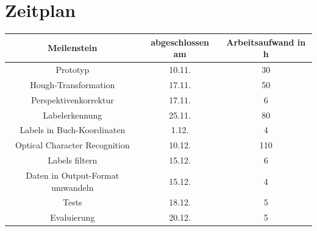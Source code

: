 \documentclass[deutsch]{scrartcl}
\begin{document}
\section{Zeitplan}
\begin{table}[h!]
	\centering
		\begin{tabular}{|c|c|c|}
		\hline
		Meilenstein & abgeschlossen am & Arbeitsaufwand in h\\
		\hline
		Prototyp & 10.11. & 30\\
		\hline
		Hough-Transformation & 17.11. & 50\\
		\hline
		Perspektivenkorrektur & 17.11. & 6\\
		\hline
		Labelerkennung & 25.11. & 80\\
		\hline
		Labels in Buch-Koordinaten & 1.12. & 4\\
		\hline
		Optical Character Recognition & 10.12. & 110\\
		\hline
		Labels filtern & 15.12. & 6\\
		\hline
		Daten in Output-Format umwandeln & 15.12. & 4\\
		\hline
		Tests & 18.12. & 5\\
		\hline
		Evaluierung & 20.12. & 5 \\
		\hline
		\end{tabular}
\end{table}


\nocite{*}

\end{document}
